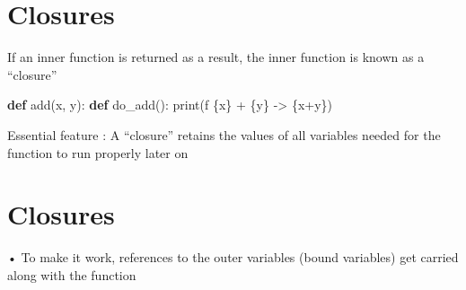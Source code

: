 \documentclass[
  letterpaper,
  DIV=11,
  numbers=noendperiod]{scrreprt}
\newenvironment{Shaded}{\begin{snugshade}}{\end{snugshade}}
\newcommand{\BuiltInTok}[1]{\textcolor[rgb]{0.00,0.23,0.31}{#1}}
\newcommand{\KeywordTok}[1]{\textcolor[rgb]{0.00,0.23,0.31}{\textbf{#1}}}
\newcommand{\NormalTok}[1]{\textcolor[rgb]{0.00,0.23,0.31}{#1}}
\newcommand{\OperatorTok}[1]{\textcolor[rgb]{0.37,0.37,0.37}{#1}}
\newcommand{\SpecialCharTok}[1]{\textcolor[rgb]{0.37,0.37,0.37}{#1}}
\newcommand{\SpecialStringTok}[1]{\textcolor[rgb]{0.13,0.47,0.30}{#1}}
\begin{document}

\chapter{Closures}\label{closures}

If an inner function is returned as a result, the inner function is
known as a ``closure''

\begin{Shaded}
\begin{Highlighting}[]
\KeywordTok{def}\NormalTok{ add(x, y):}
    \KeywordTok{def}\NormalTok{ do\_add():}
        \BuiltInTok{print}\NormalTok{(}\SpecialStringTok{f\textquotesingle{} }\SpecialCharTok{\{}\NormalTok{x}\SpecialCharTok{\}}\SpecialStringTok{ + }\SpecialCharTok{\{}\NormalTok{y}\SpecialCharTok{\}}\SpecialStringTok{ {-}\textgreater{} }\SpecialCharTok{\{}\NormalTok{x}\OperatorTok{+}\NormalTok{y}\SpecialCharTok{\}}\SpecialStringTok{\textquotesingle{}}\NormalTok{) }
\end{Highlighting}
\end{Shaded}

Essential feature : A ``closure'' retains the values of all variables
needed for the function to run properly later on


\chapter{Closures}\label{closures-1}

• To make it work, references to the outer variables (bound variables)
get carried along with the function
\end{document}
